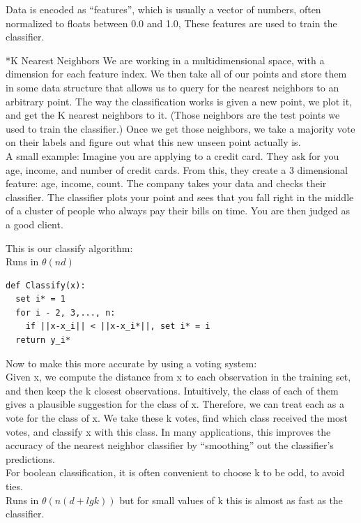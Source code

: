 \documentclass[3pt,landscape]{article}
\makeatletter
\renewcommand{\subsection}{\@startsection{subsection}{2}{0mm}{-1explus -.5ex minus -.2ex}{0.5ex plus .2ex}{\normalfont\normalsize\bfseries}}
\makeatother
\begin{document}
\begin{multicols}{3}
Data is encoded as “features”, which is usually a vector of numbers, often normalized to floats between 0.0 and 1.0, These features are used to train the classifier.

\subsection*{K Nearest Neighbors}
We are working in a multidimensional space, with a dimension for each feature index. We then take all of our points and store them in some data structure that allows us to query for the nearest neighbors to an arbitrary point. The way the classification works is given a new point, we plot it, and get the K nearest neighbors to it. (Those neighbors are the test points we used to train the classifier.) Once we get those neighbors, we take a majority vote on their labels and figure out what this new unseen point actually is.\\

A small example: Imagine you are applying to a credit card. They ask for you age, income, and number of credit cards. From this, they create a 3 dimensional feature: {age, income, count}. The company takes your data and checks their classifier. The classifier plots your point and sees that you fall right in the middle of a cluster of people who always pay their bills on time. You are then judged as a good client.

This is our classify algorithm: \\
Runs in $\theta(nd)$
\begin{verbatim}
def Classify(x):
  set i* = 1
  for i - 2, 3,..., n:
    if ||x-x_i|| < ||x-x_i*||, set i* = i
  return y_i*
\end{verbatim}

Now to make this more accurate by using a voting system:\\

Given x, we compute the distance from x to each observation in the training set, and then keep the k
closest observations. Intuitively, the class of each of them gives a plausible suggestion for the class
of x. Therefore, we can treat each as a vote for the class of x. We take these k votes, find which
class received the most votes, and classify x with this class. In many applications, this improves
the accuracy of the nearest neighbor classifier by “smoothing” out the classifier’s predictions.\\

For boolean classification, it is often convenient to choose
k to be odd, to avoid ties.\\

Runs in $\theta(n(d + lg k))$ but for small values of k this is almost as fast as the classifier. 




\scriptsize

\end{multicols}
\end{document}
